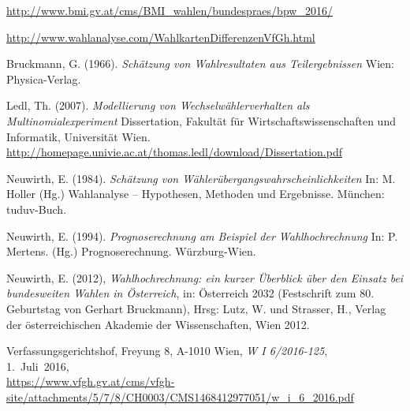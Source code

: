 \documentclass[12pt,a4paper]{article}
\theoremstyle{definition}
\begin{document}
\begin{thebibliography}{99}  

\url{http://www.bmi.gv.at/cms/BMI_wahlen/bundespraes/bpw_2016/}

\url{http://www.wahlanalyse.com/WahlkartenDifferenzenVfGh.html}

Bruckmann, G. (1966). \textit{Sch\"atzung von Wahlresultaten aus Teilergebnissen} Wien: Physica-Verlag.


Ledl, Th. (2007). \textit{Modellierung von Wechselw\"ahlerverhalten als Multinomialexperiment} Dissertation, Fakult\"at f\"ur Wirtschaftswissenschaften und Informatik, Universit\"at Wien. \url{http://homepage.univie.ac.at/thomas.ledl/download/Dissertation.pdf} 

Neuwirth, E. (1984). \textit{Sch\"atzung von W\"ahler\"ubergangswahrscheinlich\-keiten} In: M. Holler (Hg.) Wahlanalyse -- Hypothesen, Methoden und Ergebnisse. M\"unchen: tuduv-Buch.

Neuwirth, E. (1994). \textit{Prognoserechnung am Beispiel der Wahlhochrechnung} In: P. Mertens. (Hg.) Prognoserechnung. W\"urzburg-Wien.


Neuwirth, E. (2012), \textit{Wahlhochrechnung: ein kurzer \"Uberblick \"uber den Einsatz bei bundesweiten Wahlen in \"Osterreich}, in: \"Osterreich 2032 (Festschrift zum 80. Geburtstag von Gerhart Bruckmann), Hrsg: Lutz, W. und Strasser, H., Verlag der \"osterreichischen Akademie der Wissenschaften, Wien 2012.


  Verfassungsgerichtshof, Freyung 8, A-1010 Wien, \textit{W I 6/2016-125}, \\ 1.~Juli~2016, \\
  \url{https://www.vfgh.gv.at/cms/vfgh-site/attachments/5/7/8/CH0003/CMS1468412977051/w_i_6_2016.pdf}


\end{thebibliography}
\end{document}
